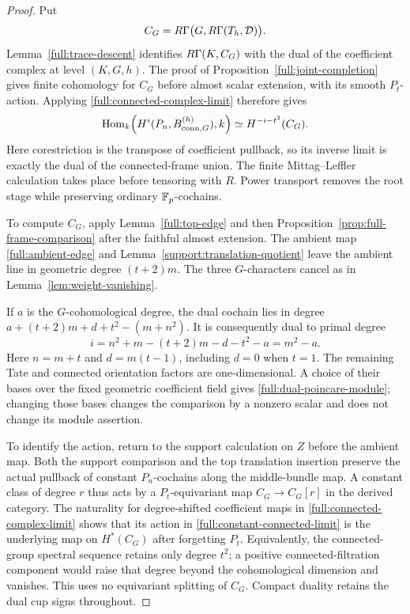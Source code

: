 \begin{proof}
Put
\[
 C_G=R\Gamma\bigl(G,R\Gamma(T_h,\mathcal D)\bigr).
\]
Lemma~\ref{full:trace-descent} identifies $R\Gamma(K,C_G)$ with
the dual of the coefficient complex at level $(K,G,h)$.
The proof of Proposition~\ref{full:joint-completion} gives finite
cohomology for $C_G$ before almost scalar extension, with its smooth
$P_t$-action.  Applying \eqref{full:connected-complex-limit} therefore
gives
\begin{equation}
\label{full:constant-connected-limit}
 \operatorname{Hom}_k\!\left(H^i(P_n,B_{\mathrm{conn},G}^{(h)}),k\right)
       \simeq H^{-i-t^2}(C_G).
\end{equation}
Here corestriction is the transpose of coefficient pullback, so its
inverse limit is exactly the dual of the connected-frame union.
The finite Mittag--Leffler calculation takes place before tensoring
with $R$.  Power transport removes the root stage while preserving
ordinary $\mathbb F_p$-cochains.

To compute $C_G$, apply Lemma~\ref{full:top-edge} and then
Proposition~\ref{prop:full-frame-comparison} after the faithful almost
extension.  The ambient map \eqref{full:ambient-edge} and
Lemma~\ref{support:translation-quotient} leave the ambient line in
geometric degree $(t+2)m$.  The three $G$-characters cancel as in
Lemma~\ref{lem:weight-vanishing}.

If $a$ is the $G$-cohomological degree, the dual cochain lies in
degree
$a+(t+2)m+d+t^2-(m+n^2)$.
It is consequently dual to primal degree
\begin{equation}
\label{full:degree-cancellation}
 i=n^2+m-(t+2)m-d-t^2-a=m^2-a.
\end{equation}
Here $n=m+t$ and $d=m(t-1)$, including $d=0$ when $t=1$.
The remaining Tate and connected orientation factors are
one-dimensional.  A choice of their bases over the fixed
geometric coefficient field gives
\eqref{full:dual-poincare-module}; changing those bases changes
the comparison by a nonzero scalar and does not change its
module assertion.

To identify the action, return to the support calculation on $Z$
before the ambient map.  Both the support comparison and the top
translation insertion preserve the actual pullback of constant
$P_n$-cochains along the middle-bundle map.  A constant class of
degree $r$ thus acts by a $P_t$-equivariant map
$C_G\to C_G[r]$ in the derived category.
The naturality for degree-shifted coefficient maps in
\eqref{full:connected-complex-limit} shows that its action in
\eqref{full:constant-connected-limit} is the underlying map on
$H^*(C_G)$ after forgetting $P_t$.
Equivalently, the connected-group spectral sequence retains only
degree $t^2$; a positive connected-filtration component would raise
that degree beyond the cohomological dimension and vanishes.
This uses no equivariant splitting of $C_G$.  Compact duality retains
the dual cup signs throughout.


\end{proof}
